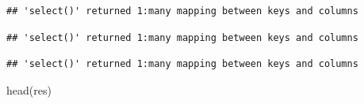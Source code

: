 \documentclass[
]{article}
\newenvironment{Shaded}{\begin{snugshade}}{\end{snugshade}}
\newcommand{\AttributeTok}[1]{\textcolor[rgb]{0.77,0.63,0.00}{#1}}
\newcommand{\FunctionTok}[1]{\textcolor[rgb]{0.00,0.00,0.00}{#1}}
\newcommand{\NormalTok}[1]{#1}
\newcommand{\OtherTok}[1]{\textcolor[rgb]{0.56,0.35,0.01}{#1}}
\newcommand{\SpecialCharTok}[1]{\textcolor[rgb]{0.00,0.00,0.00}{#1}}
\newcommand{\StringTok}[1]{\textcolor[rgb]{0.31,0.60,0.02}{#1}}
\begin{document}
\begin{verbatim}
## 'select()' returned 1:many mapping between keys and columns
\end{verbatim}

\begin{Shaded}
\end{Shaded}

\begin{verbatim}
## 'select()' returned 1:many mapping between keys and columns
\end{verbatim}

\begin{Shaded}
\end{Shaded}

\begin{verbatim}
## 'select()' returned 1:many mapping between keys and columns
\end{verbatim}

\begin{Shaded}
\begin{Highlighting}[]
\FunctionTok{head}\NormalTok{(res)}
\end{Highlighting}
\end{Shaded}
\end{document}
